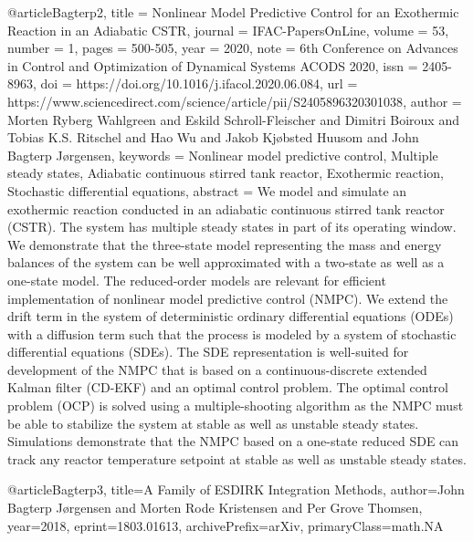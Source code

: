 @article{Bagterp2,
title = {Nonlinear Model Predictive Control for an Exothermic Reaction in an Adiabatic CSTR},
journal = {IFAC-PapersOnLine},
volume = {53},
number = {1},
pages = {500-505},
year = {2020},
note = {6th Conference on Advances in Control and Optimization of Dynamical Systems ACODS 2020},
issn = {2405-8963},
doi = {https://doi.org/10.1016/j.ifacol.2020.06.084},
url = {https://www.sciencedirect.com/science/article/pii/S2405896320301038},
author = {Morten Ryberg Wahlgreen and Eskild Schroll-Fleischer and Dimitri Boiroux and Tobias K.S. Ritschel and Hao Wu and Jakob Kjøbsted Huusom and John Bagterp Jørgensen},
keywords = {Nonlinear model predictive control, Multiple steady states, Adiabatic continuous stirred tank reactor, Exothermic reaction, Stochastic differential equations},
abstract = {We model and simulate an exothermic reaction conducted in an adiabatic continuous stirred tank reactor (CSTR). The system has multiple steady states in part of its operating window. We demonstrate that the three-state model representing the mass and energy balances of the system can be well approximated with a two-state as well as a one-state model. The reduced-order models are relevant for efficient implementation of nonlinear model predictive control (NMPC). We extend the drift term in the system of deterministic ordinary differential equations (ODEs) with a diffusion term such that the process is modeled by a system of stochastic differential equations (SDEs). The SDE representation is well-suited for development of the NMPC that is based on a continuous-discrete extended Kalman filter (CD-EKF) and an optimal control problem. The optimal control problem (OCP) is solved using a multiple-shooting algorithm as the NMPC must be able to stabilize the system at stable as well as unstable steady states. Simulations demonstrate that the NMPC based on a one-state reduced SDE can track any reactor temperature setpoint at stable as well as unstable steady states.}
}

@article{Bagterp3,
      title={A Family of ESDIRK Integration Methods}, 
      author={John Bagterp Jørgensen and Morten Rode Kristensen and Per Grove Thomsen},
      year={2018},
      eprint={1803.01613},
      archivePrefix={arXiv},
      primaryClass={math.NA}
}